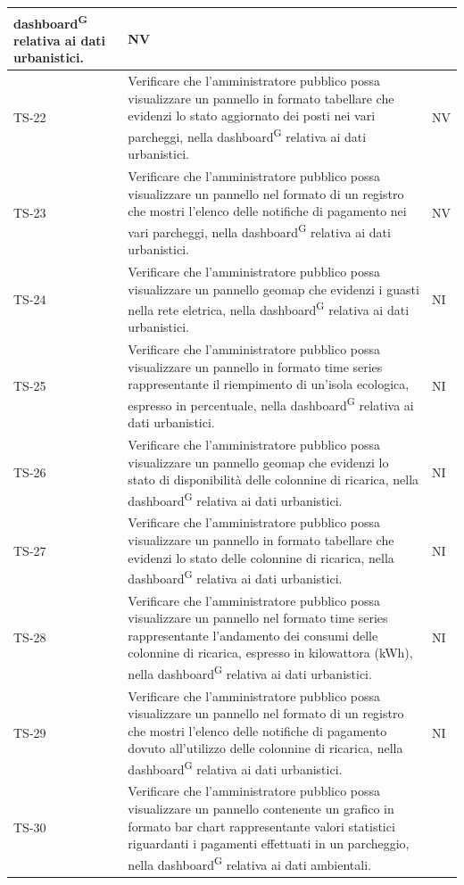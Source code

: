 \documentclass[8pt]{article}
\newcommand{\glossterm}[1]{#1\textsuperscript{G}} %
\begin{document}
\begin{longtable}{|>{\centering}p{2cm}|>{\RaggedRight}m{12cm}|>{\centering\arraybackslash}p{2cm}|}
    \glossterm{dashboard} relativa ai dati urbanistici. & NV \\
    \hline
    TS-22 & Verificare che l'amministratore pubblico possa visualizzare un pannello in formato tabellare che evidenzi lo stato aggiornato dei posti nei vari parcheggi, nella
    \glossterm{dashboard} relativa ai dati urbanistici. & NV \\
    \hline
    TS-23 & 
    Verificare che l'amministratore pubblico possa visualizzare un pannello nel formato di un registro che mostri l'elenco delle notifiche di pagamento nei vari parcheggi, nella \glossterm{dashboard} relativa ai dati urbanistici.& NV \\
    \hline
    TS-24 & 
    Verificare che l'amministratore pubblico possa visualizzare un pannello geomap che evidenzi i guasti nella rete eletrica, nella \glossterm{dashboard} relativa ai dati urbanistici.& NI \\
    \hline
    TS-25 & 
    Verificare che l'amministratore pubblico possa visualizzare un pannello in formato time series rappresentante il riempimento di un'isola ecologica, espresso in percentuale, nella \glossterm{dashboard} relativa ai dati urbanistici.& NI \\
    \hline
    TS-26 & 
    Verificare che l'amministratore pubblico possa visualizzare un pannello geomap che evidenzi lo stato di disponibilità delle colonnine di ricarica, nella \glossterm{dashboard} relativa ai dati urbanistici.& NI \\
    \hline
    TS-27 & 
    Verificare che l'amministratore pubblico possa visualizzare un pannello in formato tabellare che evidenzi lo stato delle colonnine di ricarica, nella \glossterm{dashboard} relativa ai dati urbanistici.& NI \\
    \hline
    TS-28 & 
    Verificare che l'amministratore pubblico possa visualizzare un pannello nel formato time series rappresentante l'andamento dei consumi delle colonnine di ricarica, espresso in kilowattora (kWh), nella \glossterm{dashboard} relativa ai dati urbanistici.& NI \\
    \hline
    TS-29 & 
    Verificare che l'amministratore pubblico possa visualizzare un pannello nel formato di un registro che mostri l'elenco delle notifiche di pagamento dovuto all'utilizzo delle colonnine di ricarica, nella \glossterm{dashboard} relativa ai dati urbanistici.& NI \\
    \hline
    TS-30 & Verificare che l'amministratore pubblico possa visualizzare un pannello contenente
    un grafico in formato bar chart rappresentante valori statistici riguardanti i pagamenti effettuati in un parcheggio, nella \glossterm{dashboard} relativa ai dati ambientali.

\end{longtable}
\end{document}
